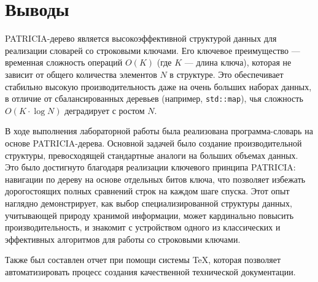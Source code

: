 \section{Выводы}
PATRICIA-дерево является высокоэффективной структурой данных для реализации словарей со строковыми ключами. Его ключевое преимущество — временная сложность операций $O(K)$ (где $K$ — длина ключа), которая не зависит от общего количества элементов $N$ в структуре. Это обеспечивает стабильно высокую производительность даже на очень больших наборах данных, в отличие от сбалансированных деревьев (например, \texttt{std::map}), чья сложность $O(K \cdot \log N)$ деградирует с ростом $N$.

В ходе выполнения лабораторной работы была реализована программа-словарь на основе PATRICIA-дерева. Основной задачей было создание производительной структуры, превосходящей стандартные аналоги на больших объемах данных. Это было достигнуто благодаря реализации ключевого принципа PATRICIA: навигации по дереву на основе отдельных битов ключа, что позволяет избежать дорогостоящих полных сравнений строк на каждом шаге спуска. Этот опыт наглядно демонстрирует, как выбор специализированной структуры данных, учитывающей природу хранимой информации, может кардинально повысить производительность, и знакомит с устройством одного из классических и эффективных алгоритмов для работы со строковыми ключами.

Также был составлен отчет при помощи системы \TeX, которая позволяет автоматизировать процесс создания качественной технической документации.
\pagebreak